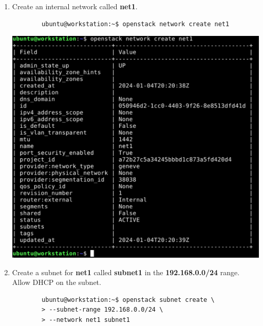 \documentclass[letterpaper, 12pt]{article}
\begin{document}
\begin{enumerate}
    \item Create an internal network called \textbf{net1}.
    \begin{lstlisting}
        ubuntu@workstation:~$ openstack network create net1
    \end{lstlisting}

    \begin{center}
        \includegraphics[width=\linewidth]{images/part1/step21.png}
    \end{center}

    \item Create a subnet for \textbf{net1} called \textbf{subnet1} in the \textbf{192.168.0.0/24} range. Allow DHCP on
    the subnet.
    \begin{lstlisting}
        ubuntu@workstation:~$ openstack subnet create \
        > --subnet-range 192.168.0.0/24 \
        > --network net1 subnet1
    \end{lstlisting}


\end{enumerate}
\end{document}
